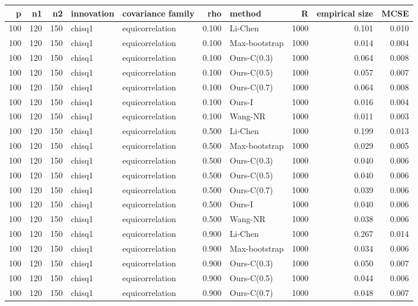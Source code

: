 \begin{tabular}{rrrllrlrrr}
\toprule
p & n1 & n2 & innovation & covariance family & rho & method & R & empirical size & MCSE \\
\midrule
100 & 120 & 150 & chisq1 & equicorrelation & 0.100 & Li-Chen & 1000 & 0.101 & 0.010 \\
100 & 120 & 150 & chisq1 & equicorrelation & 0.100 & Max-bootstrap & 1000 & 0.014 & 0.004 \\
100 & 120 & 150 & chisq1 & equicorrelation & 0.100 & Ours-C(0.3) & 1000 & 0.064 & 0.008 \\
100 & 120 & 150 & chisq1 & equicorrelation & 0.100 & Ours-C(0.5) & 1000 & 0.057 & 0.007 \\
100 & 120 & 150 & chisq1 & equicorrelation & 0.100 & Ours-C(0.7) & 1000 & 0.064 & 0.008 \\
100 & 120 & 150 & chisq1 & equicorrelation & 0.100 & Ours-I & 1000 & 0.016 & 0.004 \\
100 & 120 & 150 & chisq1 & equicorrelation & 0.100 & Wang-NR & 1000 & 0.011 & 0.003 \\
100 & 120 & 150 & chisq1 & equicorrelation & 0.500 & Li-Chen & 1000 & 0.199 & 0.013 \\
100 & 120 & 150 & chisq1 & equicorrelation & 0.500 & Max-bootstrap & 1000 & 0.029 & 0.005 \\
100 & 120 & 150 & chisq1 & equicorrelation & 0.500 & Ours-C(0.3) & 1000 & 0.040 & 0.006 \\
100 & 120 & 150 & chisq1 & equicorrelation & 0.500 & Ours-C(0.5) & 1000 & 0.040 & 0.006 \\
100 & 120 & 150 & chisq1 & equicorrelation & 0.500 & Ours-C(0.7) & 1000 & 0.039 & 0.006 \\
100 & 120 & 150 & chisq1 & equicorrelation & 0.500 & Ours-I & 1000 & 0.040 & 0.006 \\
100 & 120 & 150 & chisq1 & equicorrelation & 0.500 & Wang-NR & 1000 & 0.038 & 0.006 \\
100 & 120 & 150 & chisq1 & equicorrelation & 0.900 & Li-Chen & 1000 & 0.267 & 0.014 \\
100 & 120 & 150 & chisq1 & equicorrelation & 0.900 & Max-bootstrap & 1000 & 0.034 & 0.006 \\
100 & 120 & 150 & chisq1 & equicorrelation & 0.900 & Ours-C(0.3) & 1000 & 0.050 & 0.007 \\
100 & 120 & 150 & chisq1 & equicorrelation & 0.900 & Ours-C(0.5) & 1000 & 0.044 & 0.006 \\
100 & 120 & 150 & chisq1 & equicorrelation & 0.900 & Ours-C(0.7) & 1000 & 0.048 & 0.007 \\

\end{tabular}

